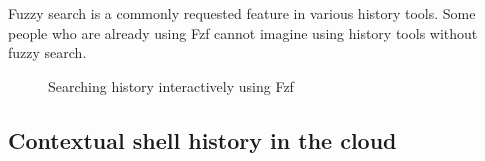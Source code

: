 Fuzzy search is a commonly requested feature in various history tools. Some people who are already using Fzf cannot imagine using history tools without fuzzy search.


\begin{figure}
  \caption{Searching history interactively using Fzf}
\end{figure}








\subsection{Contextual shell history in the cloud}


